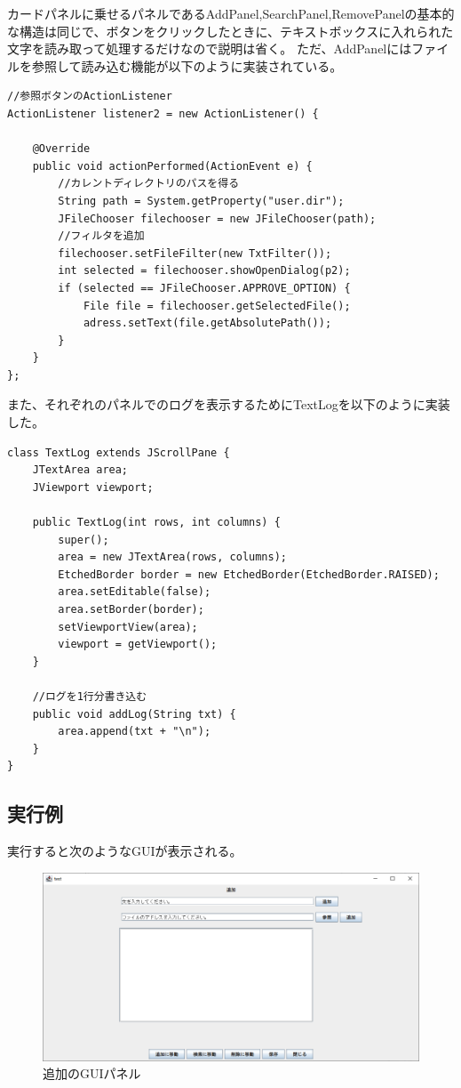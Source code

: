 \documentclass{jarticle}
\begin{document}
カードパネルに乗せるパネルであるAddPanel,SearchPanel,RemovePanelの基本的な構造は同じで、ボタンをクリックしたときに、テキストボックスに入れられた文字を読み取って処理するだけなので説明は省く。
ただ、AddPanelにはファイルを参照して読み込む機能が以下のように実装されている。
\begin{lstlisting}[caption=ファイルの参照,label=src:FileChooser]
//参照ボタンのActionListener
ActionListener listener2 = new ActionListener() {

	@Override
	public void actionPerformed(ActionEvent e) {
    	//カレントディレクトリのパスを得る
		String path = System.getProperty("user.dir");
		JFileChooser filechooser = new JFileChooser(path);
        //フィルタを追加
		filechooser.setFileFilter(new TxtFilter());
		int selected = filechooser.showOpenDialog(p2);
		if (selected == JFileChooser.APPROVE_OPTION) {
			File file = filechooser.getSelectedFile();
			adress.setText(file.getAbsolutePath());
		}
	}
};
\end{lstlisting}

また、それぞれのパネルでのログを表示するためにTextLogを以下のように実装した。
\begin{lstlisting}[caption=TextLog,label=src:TextLog]
class TextLog extends JScrollPane {
	JTextArea area;
	JViewport viewport;

	public TextLog(int rows, int columns) {
		super();
		area = new JTextArea(rows, columns);
		EtchedBorder border = new EtchedBorder(EtchedBorder.RAISED);
		area.setEditable(false);
		area.setBorder(border);
		setViewportView(area);
		viewport = getViewport();
	}

	//ログを1行分書き込む
	public void addLog(String txt) {
		area.append(txt + "\n");
	}
}
\end{lstlisting}



\subsection{実行例}
実行すると次のようなGUIが表示される。


\begin{figure}[!hbt]
  \centering
  \includegraphics[bb=0 0 986 493,width=1.2\linewidth]{pic1.png}
  \caption{追加のGUIパネル}
  \label{fig:pic1}
\end{figure}
\end{document}
